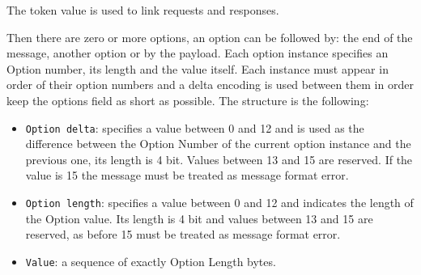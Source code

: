 	The token value is used to link requests and responses.\newline

	Then there are zero or more options, an option can be followed by: the end of the message, another option or by the payload.\newline
	Each option instance specifies an Option number, its length and the value itself.\newline
	Each instance must appear in order of their option numbers and a delta encoding is used between them in order keep the options field as short as possible.\newline
	The structure is the following:\newline
	\begin{itemize}
		\item \texttt{Option delta}: specifies a value between 0 and 12 and is used as the difference between the Option Number of the current option instance and the previous one, its length is 4 bit.
		Values between 13 and 15 are reserved.
		If the value is 15 the message must be treated as message format error.
		\item \texttt{Option length}: specifies a value between 0 and 12 and indicates the length of the Option value.
		Its length is 4 bit and values between 13 and 15 are reserved, as before 15 must be treated as message format error.
		\item \texttt{Value}: a sequence of exactly Option Length bytes.
	\end{itemize}

